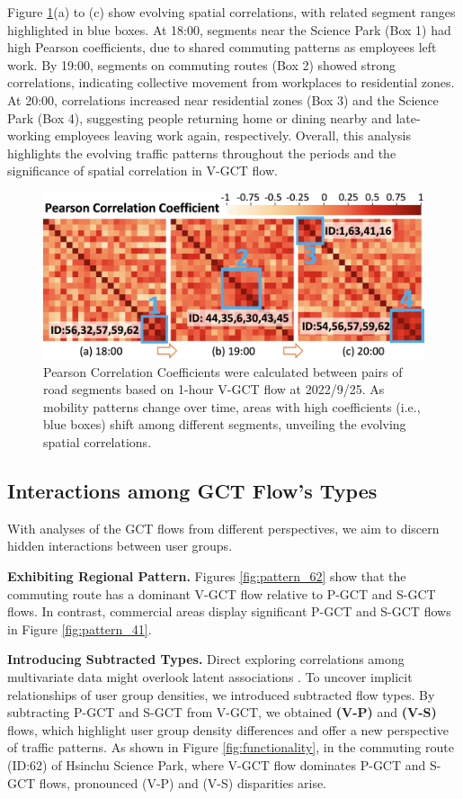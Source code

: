 \documentclass[letterpaper]{article} %
\begin{document}
Figure \ref{fig:pearson}(a) to (c) show evolving spatial correlations, with related segment ranges highlighted in blue boxes. At 18:00, segments near the Science Park (Box 1) had high Pearson coefficients, due to shared commuting patterns as employees left work. By 19:00, segments on commuting routes (Box 2) showed strong correlations, indicating collective movement from workplaces to residential zones. At 20:00, correlations increased near residential zones (Box 3) and the Science Park (Box 4), suggesting people returning home or dining nearby and late-working employees leaving work again, respectively. Overall, this analysis highlights the evolving traffic patterns throughout the periods and the significance of spatial correlation in V-GCT flow.

\begin{figure}[h]
\centering
\includegraphics[width=0.95\linewidth]{Figure/pearson_and_cluster.png}
\caption{Pearson Correlation Coefficients were calculated between pairs of road segments based on 1-hour V-GCT flow at 2022/9/25. As mobility patterns change over time, areas with high coefficients (i.e., blue boxes) shift among different segments, unveiling the evolving spatial correlations.}
\label{fig:pearson}
\end{figure}

\subsection{Interactions among GCT Flow’s Types} With analyses of the GCT flows from different perspectives, we aim to discern hidden interactions between user groups.

\noindent \textbf{Exhibiting Regional Pattern.} Figures \ref{fig:pattern_62} show that the commuting route has a dominant V-GCT flow relative to P-GCT and S-GCT flows. In contrast, commercial areas display significant P-GCT and S-GCT flows in Figure \ref{fig:pattern_41}.

\noindent \textbf{Introducing Subtracted Types.}
\label{subtract}
Direct exploring correlations among multivariate data might overlook latent associations \cite{zhao2020multivariate,deng2021graph}. To uncover implicit relationships of user group densities, we introduced subtracted flow types. By subtracting P-GCT and S-GCT from V-GCT, we obtained \textbf{(V-P)} and \textbf{(V-S)} flows, which highlight user group density differences and offer a new perspective of traffic patterns. As shown in Figure \ref{fig:functionality}, in the commuting route (ID:62) of Hsinchu Science Park, where V-GCT flow dominates P-GCT and S-GCT flows, pronounced (V-P) and (V-S) disparities arise.
\end{document}
